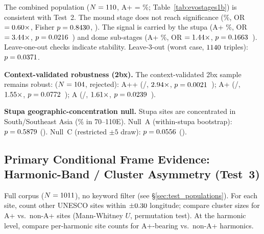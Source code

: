 \noindent The combined population ($N = 110$, A+ = \evoApRate\%;
Table~\ref{tab:evostages1b}) is consistent with Test~2. The mound stage does not reach
significance (\evoMoundApRate\%, OR $= 0.60\times$, Fisher $p = 0.8430$, \pEvoMoundFisherSig{}). The signal is carried
by the stupa (A+ \evoStupaApRate\%, OR $= 3.44\times$, $p = 0.0216$~\pEvoStupaFisherSig{}) and dome
sub-stages (A+ \evoDomeApRate\%, OR $= 1.44\times$, $p = 0.1663$~\pEvoDomeFisherSig{}).
Leave-one-out checks indicate stability.
Leave-3-out (worst case, $1140{}$ triples):
$p = 0.0371$.

\textbf{Context-validated robustness (2bx).} The context-validated 2bx sample remains robust:
($N = 104$, \NevoValidRejected{} rejected):
A++ (\NevoValidApp/\NevoValidTotal, $2.94\times$,
$p = 0.0021$~\pEvoAppValidatedFisherSig{});
A+ (\NevoValidAp/\NevoValidTotal, $1.55\times$,
$p = 0.0772$~\pEvoApValidatedFisherSig{});
A (\NevoValidA/\NevoValidTotal, $1.61\times$,
$p = 0.0239$~\pEvoAValidatedFisherSig{}).


\textbf{Stupa geographic-concentration null.}
\label{sec:stupa_geo_null}
Stupa sites are concentrated in South/Southeast Asia
(\stupaHeartlandFrac\% in 70\textdegree--110\textdegree{}E).
Null~A (within-stupa bootstrap): $p = 0.5879$ (\stupaGeoBootPSig{}).
Null~C (restricted $\pm 5$\textdegree{} draw): $p = 0.0556$ (\stupaGeoRestrictedPSig{}).

\subsection{Primary Conditional Frame Evidence: Harmonic-Band / Cluster Asymmetry (Test~3)}
\label{sec:resultscluster}

Full corpus ($N = 1011$), no keyword filter (see \S\ref{sec:test_populations}).
For each site, count other UNESCO sites within $\pm 0.30$\textdegree{}
longitude; compare cluster sizes for A+ vs.\ non-A+ sites (Mann-Whitney $U$,
permutation test). At the harmonic level, compare per-harmonic site counts
for A+-bearing vs.\ non-A+ harmonics.

